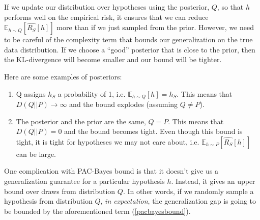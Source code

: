 \documentclass{article}
\begin{document}
If we update our distribution over hypotheses using the posterior, $Q$, so that $h$ performs well on the empirical risk, it ensures that we can reduce $\mathbb{E}_{h\sim Q}[\hat{R_S}[h]]$ more than if we just sampled from the prior. However, we need to be careful of the complexity term that bounds our generalization on the true data distribution. If we choose a ``good'' posterior that is close to the prior, then the KL-divergence will become smaller and our bound will be tighter. 

Here are some examples of posteriors:
\begin{enumerate}
    \item Q assigns $h_S$ a probability of 1, i.e. $\mathbb{E}_{h\sim Q}[h] = h_S$. This means that $D(Q||P)\rightarrow \infty$ and the bound explodes (assuming $Q \neq P$).
    \item The posterior and the prior are the same, $Q=P$. This means that $D(Q||P)=0$ and the bound becomes tight. Even though this bound is tight, it is tight for hypotheses we may not care about, i.e. $\mathbb{E}_{h\sim P}[\hat{R_S}[h]]$ can be large.
\end{enumerate}

One complication with PAC-Bayes bound is that it doesn't give us a generalization guarantee for a particular hypothesis $h$. Instead, it gives an upper bound over draws from distribution $Q$. In other words, if we randomly sample a hypothesis from distribution $Q$, \emph{in expectation}, the generalization gap is going to be bounded by the aforementioned term (\ref{pacbayesbound}).

\vspace{0.5cm}


\end{document}
